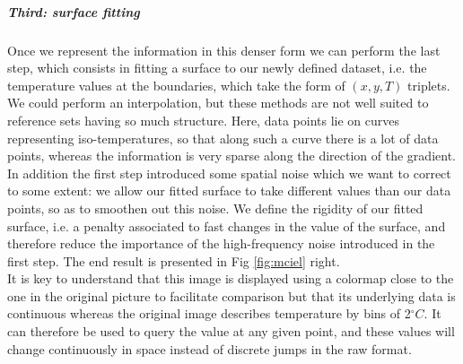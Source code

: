 \subparagraph{Third: surface fitting} Once we represent the information in this denser form we can perform the last step, which consists in fitting a surface to our newly defined dataset, i.e. the temperature values at the boundaries, which take the form of $(x,y,T)$ triplets. We could perform an interpolation, but these methods are not well suited to reference sets having so much structure. Here, data points lie on curves representing iso-temperatures, so that along such a curve there is a lot of data points, whereas the information is very sparse along the direction of the gradient. In addition the first step introduced some spatial noise which we want to correct to some extent: we allow our fitted surface to take different values than our data points, so as to smoothen out this noise. We define the rigidity of our fitted surface, i.e. a penalty associated to fast changes in the value of the surface, and therefore reduce the importance of the high-frequency noise introduced in the first step. The end result is presented in Fig \ref{fig:mciel} right. \\

It is key to understand that this image is displayed using a colormap close to the one in the original picture to facilitate comparison but that its underlying data is continuous whereas the original image describes temperature by bins of 2$^{\circ}C$. It can therefore be used to query the value at any given point, and these values will change continuously in space instead of discrete jumps in the raw format.\\

